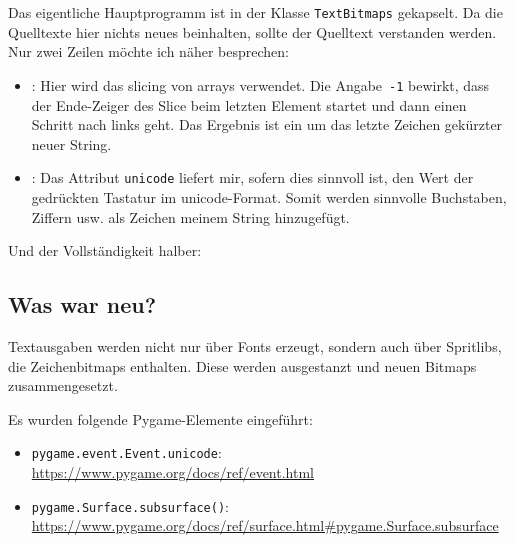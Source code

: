 Das eigentliche Hauptprogramm ist in der Klasse \texttt{TextBitmaps} gekapselt. Da die Quelltexte hier nichts neues beinhalten, sollte der Quelltext verstanden werden. Nur zwei Zeilen möchte ich näher besprechen:

\begin{itemize}
    \item {}: Hier wird das \gls{slicing} von \glspl{array} verwendet. Die Angabe~\texttt{-1} bewirkt, dass der Ende-Zeiger des Slice beim letzten Element startet und dann einen Schritt nach links geht. Das Ergebnis ist ein um das letzte Zeichen gekürzter neuer String.

    \item {}: Das Attribut \texttt{unicode} liefert mir, sofern dies sinnvoll ist, den Wert der gedrückten Tastatur im \gls{unicode}-Format. Somit werden sinnvolle Buchstaben, Ziffern usw. als Zeichen meinem String hinzugefügt.
\end{itemize}


Und der Vollständigkeit halber:



\subsection*{Was war neu?}

Textausgaben werden nicht nur über Fonts erzeugt, sondern auch über Spritlibs, die Zeichenbitmaps enthalten. Diese werden ausgestanzt und neuen Bitmaps zusammengesetzt.

Es wurden folgende Pygame-Elemente eingeführt:

\begin{itemize}
	\item \texttt{pygame.event.Event.unicode}:
	\\ \url{https://www.pygame.org/docs/ref/event.html}

	\item \texttt{pygame.Surface.subsurface()}:
	\\ \url{https://www.pygame.org/docs/ref/surface.html#pygame.Surface.subsurface}
	
\end{itemize}
